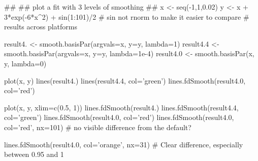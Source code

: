 \documentclass{article}
\begin{document}
\begin{Examples}
\begin{ExampleCode}
##
## plot a fit with 3 levels of smoothing
##
x <- seq(-1,1,0.02)
y <- x + 3*exp(-6*x^2) + sin(1:101)/2
# sin not rnorm to make it easier to compare
# results across platforms 

result4. <- smooth.basisPar(argvals=x, y=y, lambda=1)
result4.4 <- smooth.basisPar(argvals=x, y=y, lambda=1e-4)
result4.0 <- smooth.basisPar(x, y, lambda=0)

plot(x, y)
lines(result4.)
lines(result4.4, col='green')
lines.fdSmooth(result4.0, col='red') 

plot(x, y, xlim=c(0.5, 1))
lines.fdSmooth(result4.)
lines.fdSmooth(result4.4, col='green')
lines.fdSmooth(result4.0, col='red')  
lines.fdSmooth(result4.0, col='red', nx=101)
# no visible difference from the default?  

lines.fdSmooth(result4.0, col='orange', nx=31)
# Clear difference, especially between 0.95 and 1  

\end{ExampleCode}
\end{Examples}
\end{document}

